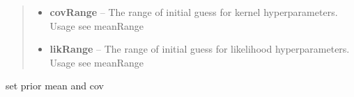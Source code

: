 \documentclass[letterpaper,10pt,english]{sphinxmanual}
\begin{document}
\begin{fulllineitems}
\begin{fulllineitems}
\begin{quote}
\begin{description}
\begin{itemize}
(-5,5) for each hyperparameter by default.


\item {} 
\textbf{covRange} -- The range of initial guess for kernel hyperparameters. Usage see meanRange

\item {} 
\textbf{likRange} -- The range of initial guess for likelihood hyperparameters. Usage see meanRange

\end{itemize}

\end{description}\end{quote}

\end{fulllineitems}


\begin{fulllineitems}
\label{pyGPs.Core:pyGPs.Core.gp.GP.setPrior}
set prior mean and cov

\end{fulllineitems}


\end{fulllineitems}

\end{document}
